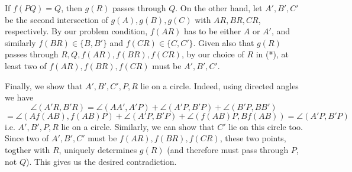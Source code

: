 \documentclass[11pt,a4paper]{article}
\begin{document}
\begin{enumerate}
    If $f(PQ)=Q$, then $g(R)$ passes through $Q$. 
    On the other hand, let $A', B', C'$ be the second intersection of $g(A), g(B), g(C)$ with $AR, BR, CR$, respectively. 
    By our problem condition, $f(AR)$ has to be either $A$ or $A'$, and similarly $f(BR)\in \{B, B'\}$ and $f(CR)\in \{C, C'\}$. 
    Given also that $g(R)$ passes through $R, Q, f(AR), f(BR), f(CR)$, 
    by our choice of $R$ in (*), at least two of $f(AR), f(BR), f(CR)$ must be $A', B', C'$. 
    
    Finally, we show that $A', B', C', P, R$ lie on a circle. 
    Indeed, using directed angles we have 
    \[
    \angle (A'R, B'R)
    =\angle(AA', A'P)+\angle(A'P, B'P) + \angle(B'P, BB')
    \]\[
    =\angle(Af(AB), f(AB)P)+\angle(A'P, B'P) + \angle(f(AB)P, Bf(AB))
    =\angle(A'P, B'P)
    \]
    i.e. $A', B', P, R$ lie on a circle. Similarly, we can show that $C'$ lie on this circle too. 
    Since two of $A', B', C'$ must be $f(AR), f(BR), f(CR)$, these two points, togther with $R$, 
    uniquely determines $g(R)$ (and therefore must pass through $P$, not $Q$). 
    This gives us the desired contradiction. 
\end{enumerate}
\end{document}

